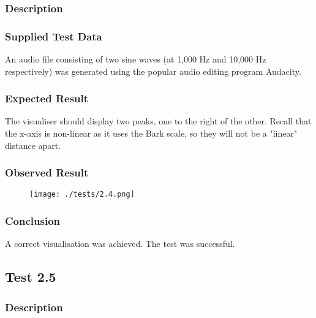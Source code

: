 \subsubsection{Description}
\paragraph{}
{
	\centering
}

\subsubsection{Supplied Test Data}
An audio file consisting of two sine waves (at 1,000 Hz and 10,000 Hz respectively) was generated using the popular audio editing program Audacity.

\subsubsection{Expected Result}
The visualiser should display two peaks, one to the right of the other. Recall that the x-axis is non-linear as it uses the Bark scale, so they will not be a "linear" distance apart.

\subsubsection{Observed Result}
\label{sec:evidence2.4}
\begin{figure}[H]
	\texttt{[image: ./tests/2.4.png]}
\end{figure}

\subsubsection{Conclusion}
A correct visualisation was achieved. The test was successful.


\pagebreak
\subsection{Test 2.5}
\subsubsection{Description}
\paragraph{}
{
	\centering
}

